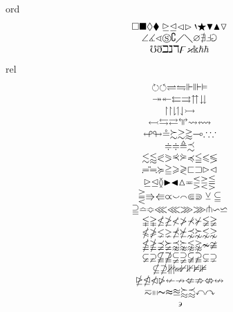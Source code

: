 \documentclass[11pt]{article}
\begin{document}
ord
$$
\begin{array}{c}
\square\blacksquare\lozenge\blacklozenge\trianglerighteq\trianglelefteq\vartriangleleft\vartriangleright\backprime\bigstar\blacktriangledown\blacktriangle\triangledown\\
\angle
\measuredangle\sphericalangle\circledS\complement\diagup\diagdown\varnothing\nexists\Finv\Game\\
\mho
\eth\beth\gimel\daleth\digamma\varkappa\Bbbk\hslash
\hbar
\end{array}
$$
rel
$$
\begin{array}{c}
\circlearrowright\circlearrowleft\rightleftharpoons\leftrightharpoons\Vdash\Vvdash\vDash\\
\twoheadrightarrow\twoheadleftarrow\leftleftarrows\rightrightarrows\upuparrows\downdownarrows\\
\upharpoonright\restriction\downharpoonright\upharpoonleft\downharpoonleft\rightarrowtail\\
\leftarrowtail\leftrightarrows\rightleftarrows\Lsh\Rsh\rightsquigarrow\leftrightsquigarrow\\
\looparrowleft\looparrowright\circeq\succsim\gtrsim\gtrapprox\multimap\therefore\because\\
\doteqdot\Doteq\triangleq\precsim\\
\lesssim
\lessapprox
\eqslantless
\eqslantgtr
\curlyeqprec
\curlyeqsucc
\preccurlyeq
\leqq
\leqslant
\lessgtr\\
\risingdotseq
\fallingdotseq
\succcurlyeq
\geqq
\geqslant
\gtrless
\sqsubset
\sqsupset
\vartriangleright
\vartriangleleft\\
\trianglerighteq
\trianglelefteq
\between
\blacktriangleright
\blacktriangleleft
\vartriangle
\eqcirc
\lesseqgtr
\gtreqless
\lesseqqgtr\\
\gtreqqless
\Rrightarrow
\Lleftarrow
\varpropto
\smallsmile
\smallfrown
\Subset
\Supset
\veebar
\subseteqq\\
\supseteqq
\bumpeq
\Bumpeq
\lll
\llless
\ggg
\gggtr
\pitchfork
\backsim
\backsimeq\\
\lvertneqq
\gvertneqq
\nleq
\ngeq
\nless
\ngtr
\nprec
\nsucc
\lneqq
\gneqq\\
\nleqslant
\ngeqslant
\lneq
\gneq
\npreceq
\nsucceq
\precnsim
\succnsim
\lnsim
\gnsim\\
\nleqq
\ngeqq
\precneqq
\succneqq
\precnapprox
\succnapprox
\lnapprox
\gnapprox
\nsim
\ncong\\
\varsubsetneq
\varsupsetneq
\nsubseteqq
\nsupseteqq
\subsetneqq
\supsetneqq
\varsubsetneqq
\varsupsetneqq
\subsetneq
\supsetneq\\
\nsubseteq
\nsupseteq
\nparallel
\nmid
\nshortmid
\nshortparallel
\nvdash
\nVdash
\nvDash
\nVDash\\
\ntrianglerighteq
\ntrianglelefteq
\ntriangleleft
\ntriangleright
\nleftarrow
\nrightarrow
\nLeftarrow
\nRightarrow
\nLeftrightarrow
\nleftrightarrow\\
\eqsim
\shortmid
\shortparallel
\thicksim
\thickapprox
\approxeq
\succapprox
\precapprox
\curvearrowleft
\curvearrowright\\
\backepsilon
\end{array}
$$
\end{document}
